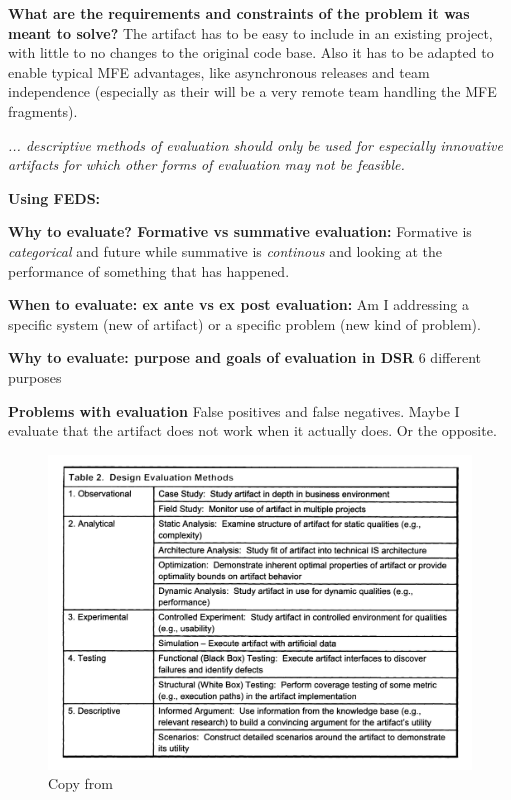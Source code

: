 \textbf{What are the requirements and constraints of the problem it was meant to solve?}
The artifact has to be easy to include in an existing project, with little to no changes to the original code base. Also it has to be adapted to enable typical \ac{MFE} advantages, like asynchronous releases and team independence (especially as their will be a very remote team handling the \ac{MFE} fragments).

\textit{... descriptive methods of evaluation should only be used for especially innovative artifacts for which other forms of evaluation may not be feasible.}

\textbf{Using FEDS:}

\textbf{Why to evaluate? Formative vs summative evaluation:} Formative is \textit{categorical} and future while summative is \textit{continous} and looking at the performance of something that has happened.

\textbf{When to evaluate: ex ante vs ex post evaluation:} Am I addressing a specific system (new of artifact) or a specific problem (new kind of problem).

\textbf{Why to evaluate: purpose and goals of evaluation in DSR}
6 different purposes

\textbf{Problems with evaluation}
False positives and false negatives. Maybe I evaluate that the artifact does not work when it actually does. Or the opposite.

\begin{figure}[!ht]
    \centering
    \includegraphics[width=\textwidth]{images/copy-temp.png}
    \caption{Copy from \cite{Hevner2004}}
\end{figure}


